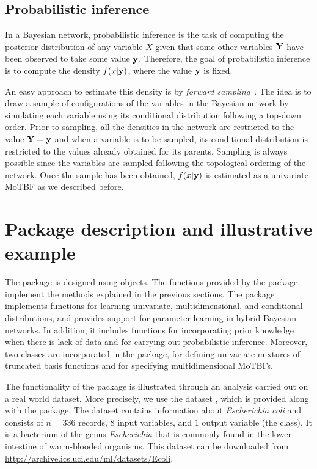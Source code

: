 \subsection{Probabilistic inference}
\label{sec:inference}

In a Bayesian network, probabilistic inference is the task of computing the posterior distribution of any
variable $X$  given that some other variables $\mathbf{Y}$ have been
observed to take some value $\mathbf{y}$. Therefore, the goal of probabilistic inference is to compute
the density $f(x|\mathbf{y})$, where the value $\mathbf{y}$ is fixed. 

An easy approach to estimate this density is by \emph{forward sampling}~\citep{Hen88}.
The idea is to draw a sample of configurations of the variables in the Bayesian network by simulating each variable
using its conditional distribution following a top-down order. Prior to sampling, all the densities
in the network are restricted to the value $\mathbf{Y}=\mathbf{y}$ and when a variable is to be sampled,
its conditional distribution is restricted to the values already obtained for its parents. 
Sampling is always possible since the variables are sampled following the topological ordering of the network.
Once the sample has been obtained,
$f(x|\mathbf{y})$ is estimated as a univariate MoTBF as we described before. 


\section{Package description and illustrative example} \label{sec:package}

The  package  is designed using  objects.
The functions provided by the package
implement the methods explained in the previous sections.
The package implements functions for learning univariate, multidimensional, and
conditional distributions, and provides support for parameter learning in  hybrid Bayesian
networks. In addition, it includes functions for incorporating prior knowledge when 
there is lack of data and for carrying out probabilistic inference.
Moreover, two classes are incorporated in the package,  for defining univariate mixtures of truncated basis functions 
and  for specifying multidimensional MoTBFs.

The functionality of the  package is illustrated through an analysis carried out on a real world dataset. 
More precisely, we use the  dataset \citep{Lichman:2013}, which is provided along with the package. 
The dataset contains information about 
\textit{Escherichia coli} and consists of $n = 336$ records, $8$ input variables, and $1$ output variable (the class).  It is a bacterium of the genus \textit{Escherichia} that is commonly found in the lower intestine of warm-blooded organisms.
This dataset can be downloaded from \url{http://archive.ics.uci.edu/ml/datasets/Ecoli}.

